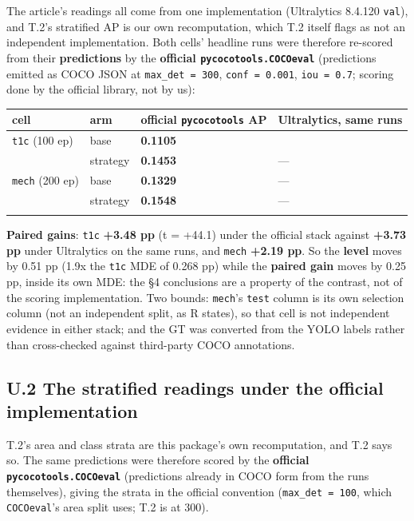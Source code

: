 \documentclass[pdflatex,sn-mathphys-ay]{sn-jnl}
\begin{document}
The article's readings all come from one implementation (Ultralytics 8.4.120 \texttt{val}), and T.2's stratified AP is our own recomputation, which T.2 itself flags as not an independent implementation. Both cells' headline runs were therefore re-scored from their \textbf{predictions} by the \textbf{official \texttt{pycocotools.COCOeval}} (predictions emitted as COCO JSON at \texttt{max\_det = 300}, \texttt{conf = 0.001}, \texttt{iou = 0.7}; scoring done by the official library, not by us):

{\footnotesize
\setlength{\tabcolsep}{4pt}
\begin{longtable}{p{}p{}>{\raggedleft\arraybackslash}p{}>{\raggedleft\arraybackslash}p{}}
\toprule
cell & arm & official \texttt{pycocotools} AP & Ultralytics, same runs \\
\midrule
\endhead
\texttt{t1c} (100 ep) & base & \textbf{0.1105} & 0.1156 \\
 & strategy & \textbf{0.1453} & --- \\
\texttt{mech} (200 ep) & base & \textbf{0.1329} & --- \\
 & strategy & \textbf{0.1548} & --- \\
\botrule
\end{longtable}}

\textbf{Paired gains}: \texttt{t1c} \textbf{+3.48 pp} (t = +44.1) under the official stack against \textbf{+3.73 pp} under Ultralytics on the same runs, and \texttt{mech} \textbf{+2.19 pp}. So the \textbf{level} moves by 0.51 pp (1.9x the \texttt{t1c} MDE of 0.268 pp) while the \textbf{paired gain} moves by 0.25 pp, inside its own MDE: the \S{}4 conclusions are a property of the contrast, not of the scoring implementation. Two bounds: \texttt{mech}'s \texttt{test} column is its own selection column (not an independent split, as R states), so that cell is not independent evidence in either stack; and the GT was converted from the YOLO labels rather than cross-checked against third-party COCO annotations.

\subsection*{U.2 The stratified readings under the official implementation}

T.2's area and class strata are this package's own recomputation, and T.2 says so. The same predictions were therefore scored by the \textbf{official \texttt{pycocotools.COCOeval}} (predictions already in COCO form from the runs themselves), giving the strata in the official convention (\texttt{max\_det = 100}, which \texttt{COCOeval}'s area split uses; T.2 is at 300).
\end{document}
